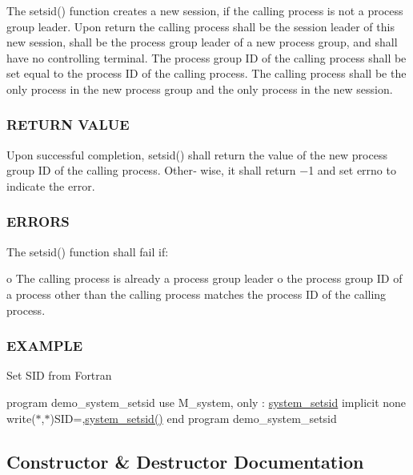 The setsid() function creates a new session, if the calling process is not a process group leader. Upon return the calling process shall be the session leader of this new session, shall be the process group leader of a new process group, and shall have no controlling terminal. The process group ID of the calling process shall be set equal to the process ID of the calling process. The calling process shall be the only process in the new process group and the only process in the new session.

\subsubsection*{R\+E\+T\+U\+RN V\+A\+L\+UE}

Upon successful completion, setsid() shall return the value of the new process group ID of the calling process. Other‐ wise, it shall return −1 and set errno to indicate the error. \subsubsection*{E\+R\+R\+O\+RS}

The setsid() function shall fail if\+:

o The calling process is already a process group leader o the process group ID of a process other than the calling process matches the process ID of the calling process. \subsubsection*{E\+X\+A\+M\+P\+LE}

Set S\+ID from Fortran

program demo\+\_\+system\+\_\+setsid use M\+\_\+system, only \+: \mbox{\hyperlink{interfacem__system_1_1system__setsid}{system\+\_\+setsid}} implicit none write($\ast$,$\ast$)\textquotesingle{}S\+ID=\textquotesingle{},\mbox{\hyperlink{interfacem__system_1_1system__setsid_a3368836e902ccbf8e0418c56f18e2df3}{system\+\_\+setsid()}} end program demo\+\_\+system\+\_\+setsid 

\subsection{Constructor \& Destructor Documentation}
\mbox{\label{interfacem__system_1_1system__setsid_a3368836e902ccbf8e0418c56f18e2df3}} 
